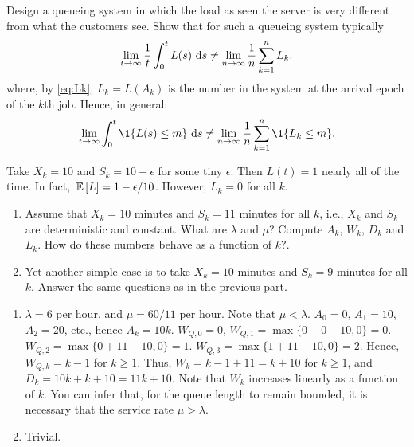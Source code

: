 \begin{question}
Design a queueing system in which the load as seen the server is very
different from what the customers see. Show that for such a queueing system typically
\begin{equation*}
  \lim_{t\to\infty} \frac 1 t\int_0^t L(s)\, \,\text{d}s \neq   \lim_{n\to\infty}\frac 1n  \sum_{k=1}^n L_k.
\end{equation*}
where, by \eqref{eq:Lk}, $L_k=L(A_k)$ is the number in the system at the arrival epoch of the $k$th job. Hence, in general:
  \begin{equation*}
    \lim_{t\to\infty} \int_0^t \1{L(s)\leq m}\,\d s \neq \lim_{n\to\infty} \frac 1n \sum_{k=1}^n \1{L_k \leq m}.
  \end{equation*}


\begin{solution}
  Take $X_k = 10$ and $S_k = 10-\epsilon$ for some tiny
  $\epsilon$. Then $L(t) = 1$ nearly all of the time. In fact,
  $\,\mathbb{E}\left[L\right] = 1-\epsilon/10$. However, $L_k=0$ for all $k$.
\end{solution}
\end{question}


\begin{question}\label{ex:2}
  \begin{enumerate}
  \item Assume that $X_k = 10$ minutes and $S_k = 11$ minutes for all
    $k$, i.e., $X_k$ and $S_k$ are deterministic and constant. What
    are $\lambda$ and $\mu$?  Compute $A_k$, $W_k$, $D_k$ and
    $L_k$. How do these numbers behave as a function of $k$?.
  \item Yet another simple case is to take $X_k=10$ minutes and
    $S_k=9$ minutes for all $k$. Answer the same questions as in the
    previous part.
  \end{enumerate}
  \begin{solution}
    \begin{enumerate}
    \item $\lambda=6$ per hour, and $\mu=60/11$ per hour. Note that
      $\mu < \lambda$. $A_0 = 0$, $A_1=10$, $A_2=20$, etc., hence
      $A_k = 10k$. $W_{Q,0} = 0$, $W_{Q,1} = \max\{0 + 0-10,0\} = 0$.
      $W_{Q,2} = \max\{0+11-10,0\} =1$.
      $W_{Q,3} = \max\{1+11-10,0\} =2$. Hence, $W_{Q,k} = k-1$ for
      $k\geq1$. Thus, $W_k = k-1+11 = k + 10$ for $k\geq1$, and
      $D_k = 10k + k+10 = 11k+10$. Note that $W_k$ increases linearly
      as a function of $k$.  You can infer that, for the queue length
      to remain bounded, it is necessary that the service rate
      $\mu > \lambda$.
    \item Trivial.
    \end{enumerate}
  \end{solution}
\end{question}


